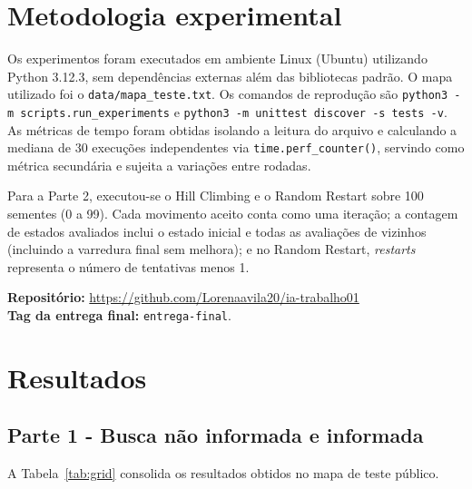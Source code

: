 \documentclass[12pt]{article}
\begin{document}
\section{Metodologia experimental}
Os experimentos foram executados em ambiente Linux (Ubuntu) utilizando Python 3.12.3, sem dependências externas além das bibliotecas padrão. O mapa utilizado foi o \texttt{data/mapa\_teste.txt}. Os comandos de reprodução são \texttt{python3 -m scripts.run\_experiments} e \texttt{python3 -m unittest discover -s tests -v}. As métricas de tempo foram obtidas isolando a leitura do arquivo e calculando a mediana de 30 execuções independentes via \texttt{time.perf\_counter()}, servindo como métrica secundária e sujeita a variações entre rodadas.

Para a Parte 2, executou-se o Hill Climbing e o Random Restart sobre 100 sementes (0 a 99). Cada movimento aceito conta como uma iteração; a contagem de estados avaliados inclui o estado inicial e todas as avaliações de vizinhos (incluindo a varredura final sem melhora); e no Random Restart, \textit{restarts} representa o número de tentativas menos 1.

\noindent\textbf{Repositório:} \url{https://github.com/Lorenaavila20/ia-trabalho01} \\
\textbf{Tag da entrega final:} \texttt{entrega-final}.

\section{Resultados}
\subsection{Parte 1 - Busca não informada e informada}
A Tabela~\ref{tab:grid} consolida os resultados obtidos no mapa de teste público.

\begin{table}[H]
\centering
\caption{Resultados dos algoritmos de busca no mapa de teste.}
\label{tab:grid}
\end{table}
\end{document}
